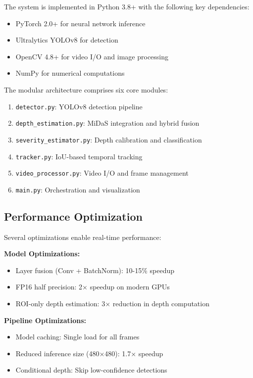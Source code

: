 \documentclass[conference]{IEEEtran}
\begin{document}
The system is implemented in Python 3.8+ with the following key dependencies:

\begin{itemize}
    \item PyTorch 2.0+ for neural network inference
    \item Ultralytics YOLOv8 for detection
    \item OpenCV 4.8+ for video I/O and image processing
    \item NumPy for numerical computations
\end{itemize}

The modular architecture comprises six core modules:

\begin{enumerate}
    \item \texttt{detector.py}: YOLOv8 detection pipeline
    \item \texttt{depth\_estimation.py}: MiDaS integration and hybrid fusion
    \item \texttt{severity\_estimator.py}: Depth calibration and classification
    \item \texttt{tracker.py}: IoU-based temporal tracking
    \item \texttt{video\_processor.py}: Video I/O and frame management
    \item \texttt{main.py}: Orchestration and visualization
\end{enumerate}

\subsection{Performance Optimization}

Several optimizations enable real-time performance:

\textbf{Model Optimizations:}
\begin{itemize}
    \item Layer fusion (Conv + BatchNorm): 10-15\% speedup
    \item FP16 half precision: 2× speedup on modern GPUs
    \item ROI-only depth estimation: 3× reduction in depth computation
\end{itemize}

\textbf{Pipeline Optimizations:}
\begin{itemize}
    \item Model caching: Single load for all frames
    \item Reduced inference size (480×480): 1.7× speedup
    \item Conditional depth: Skip low-confidence detections
\end{itemize}
\end{document}
